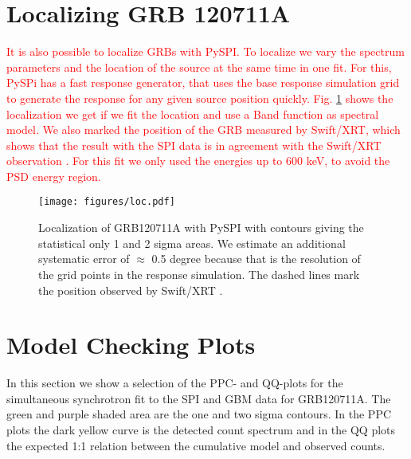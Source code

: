 \documentclass[twocolumn,traditabstract]{aa}
\newcommand{\BB}[1]{\textcolor{red}{\textsf{#1}}}
\begin{document}


\begin{appendix}

  \section{Localizing GRB 120711A}

  \BB{It is also possible to localize GRBs with PySPI. To localize we vary the spectrum parameters and the location of the source at the same time in one fit. For this, PySPi has a fast response generator, that uses the base response simulation grid to generate the response for any given source position quickly. Fig. \ref{fig:localization} shows the localization we get if we fit the location and use a Band function as spectral model. We also marked the position of the GRB measured by Swift/XRT, which shows that the result with the SPI data is in agreement with the Swift/XRT observation \citep{GCN_swift}. For this fit we only used the energies up to 600 keV, to avoid the PSD energy region.}

  \begin{figure}
  \begin{centering}
    \texttt{[image: figures/loc.pdf]}
    \caption{Localization of GRB120711A with PySPI with contours giving the statistical only 1 and 2 sigma areas. We estimate an additional systematic error of $\approx$ 0.5 degree because that is the resolution of the grid points in the response simulation. The dashed lines mark the position observed by Swift/XRT \citep{GCN_swift}.}
    \label{fig:localization}
  \end{centering}
\end{figure}

\onecolumn
  \section{Model Checking Plots}
  \label{appendix}
  In this section we show a selection of the PPC- and QQ-plots for the simultaneous synchrotron fit to the SPI and GBM data for GRB120711A. The green and purple shaded area are the one and two sigma contours. In the PPC plots the dark yellow curve is the detected count spectrum and in the QQ plots the expected 1:1 relation between the cumulative model and observed counts.


\end{appendix}
\end{document}
